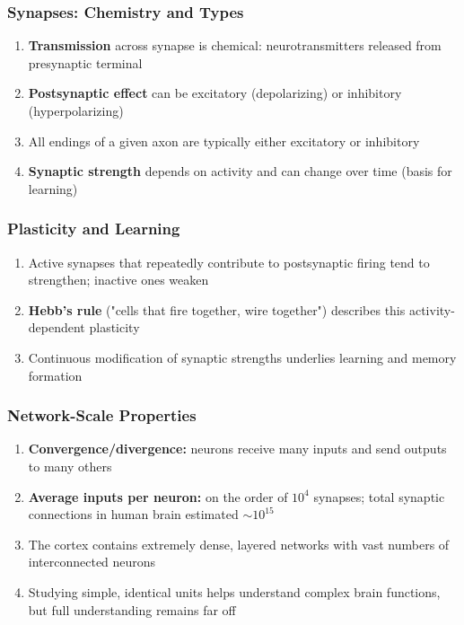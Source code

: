 \subsubsection{Synapses: Chemistry and Types}
\label{subsubsec:synapses}

\begin{enumerate}
\item \textbf{Transmission} across synapse is chemical: neurotransmitters released from presynaptic terminal
\item \textbf{Postsynaptic effect} can be excitatory (depolarizing) or inhibitory (hyperpolarizing)
\item All endings of a given axon are typically either excitatory or inhibitory
\item \textbf{Synaptic strength} depends on activity and can change over time (basis for learning)
\end{enumerate}

\subsubsection{Plasticity and Learning}
\label{subsubsec:plasticity-learning}

\begin{enumerate}
\item Active synapses that repeatedly contribute to postsynaptic firing tend to strengthen; inactive ones weaken
\item \textbf{Hebb's rule} ("cells that fire together, wire together") describes this activity-dependent plasticity
\item Continuous modification of synaptic strengths underlies learning and memory formation
\end{enumerate}

\subsubsection{Network-Scale Properties}
\label{subsubsec:network-scale-properties}

\begin{enumerate}
\item \textbf{Convergence/divergence:} neurons receive many inputs and send outputs to many others
\item \textbf{Average inputs per neuron:} on the order of $10^4$ synapses; total synaptic connections in human brain estimated $\sim 10^{15}$
\item The cortex contains extremely dense, layered networks with vast numbers of interconnected neurons
\item Studying simple, identical units helps understand complex brain functions, but full understanding remains far off
\end{enumerate}

